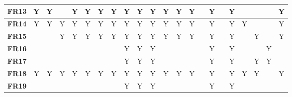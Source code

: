 \documentclass{article}
\begin{document}
\begin{table}[H]
\begin{adjustwidth}{-1.65in}{-1in}
{\begin{tabular}{c|c|c|c|c|c|c|c|c|c|c|c|c|c|c|c|c|c|c|c|c|c|}
\multicolumn{1}{|l|}{\textbf{FR13}} & Y            & Y            &              & Y            & Y            & Y            & Y            & Y            & Y            & Y            & Y            & Y            & Y            &              & Y            &              & Y            &              &             &             & Y           \\ \hline
\multicolumn{1}{|l|}{\textbf{FR14}} & Y            & Y            & Y            & Y            & Y            & Y            & Y            & Y            & Y            & Y            & Y            & Y            & Y            &              & Y            &              & Y            & Y            &             &             & Y           \\ \hline
\multicolumn{1}{|l|}{\textbf{FR15}} &              &              & Y            & Y            & Y            & Y            & Y            & Y            & Y            & Y            & Y            & Y            & Y            &              & Y            &              & Y            &              & Y           &             & Y           \\ \hline
\multicolumn{1}{|l|}{\textbf{FR16}} &              &              &              &              &              &              &              & Y            & Y            & Y            &              &              &              &              & Y            &              & Y            &              &             & Y           &             \\ \hline
\multicolumn{1}{|l|}{\textbf{FR17}} &              &              &              &              &              &              &              & Y            & Y            & Y            &              &              &              &              & Y            &              & Y            &              & Y           & Y           &             \\ \hline
\multicolumn{1}{|l|}{\textbf{FR18}} & Y            & Y            & Y            & Y            & Y            & Y            & Y            & Y            & Y            & Y            & Y            & Y            & Y            &              & Y            &              & Y            & Y            & Y           &             & Y           \\ \hline
\multicolumn{1}{|l|}{\textbf{FR19}} &              &              &              &              &              &              &              & Y            & Y            & Y            &              &              &              &              & Y            &              & Y            &              &             &             &             \\ \hline

\end{tabular}}
\end{adjustwidth}
\end{table}
\end{document}
